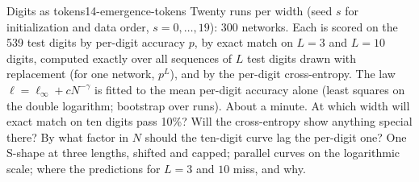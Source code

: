 \begin{refsection}
\begin{lab}{Digits as tokens}{14-emergence-tokens}\label{lab:emergence:tokens}
 Twenty runs per width (seed $s$ for initialization and data order, $s=0,\dots,19$): 300 networks. Each is scored on the 539 test digits by per-digit accuracy $p$, by exact match on $L=3$ and $L=10$ digits, computed exactly over all sequences of $L$ test digits drawn with replacement (for one network, $p^L$), and by the per-digit cross-entropy. The law $\ell=\ell_\infty+cN^{-\gamma}$ is fitted to the mean per-digit accuracy alone (least squares on the double logarithm; bootstrap over runs). About a minute.
 At which width will exact match on ten digits pass 10\%? Will the cross-entropy show anything special there? By what factor in $N$ should the ten-digit curve lag the per-digit one?
 One S-shape at three lengths, shifted and capped; parallel curves on the logarithmic scale; where the predictions for $L=3$ and $10$ miss, and why.
\end{lab}


\end{refsection}
